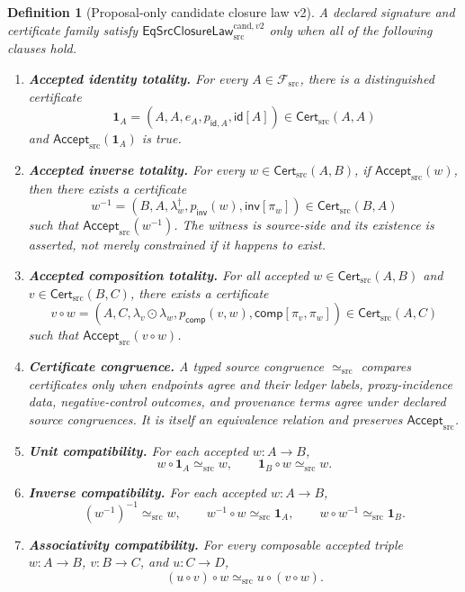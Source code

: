 \documentclass[11pt]{article}
\newtheorem{definition}{Definition}
\newcommand{\Cert}{\mathsf{Cert}_{\mathrm{src}}}
\newcommand{\Accept}{\mathsf{Accept}_{\mathrm{src}}}
\newcommand{\Law}{\mathsf{EqSrcClosureLaw}^{\mathrm{cand},v2}_{\mathrm{src}}}
\begin{document}
\begin{definition}[Proposal-only candidate closure law v2]
A declared signature and certificate family satisfy \(\Law\) only when all of
the following clauses hold.

\begin{enumerate}[leftmargin=*]
  \item \textbf{Accepted identity totality.}
  For every \(A\in\mathcal F_{\mathrm{src}}\), there is a distinguished
  certificate
  \[
    \mathbf 1_A
    =(A,A,e_A,p_{\mathsf{id},A},\mathsf{id}[A])
    \in\Cert(A,A)
  \]
  and \(\Accept(\mathbf 1_A)\) is true.

  \item \textbf{Accepted inverse totality.}
  For every \(w\in\Cert(A,B)\), if \(\Accept(w)\), then there exists a
  certificate
  \[
    w^{-1}
    =(B,A,\lambda_w^\dagger,p_{\mathsf{inv}}(w),
      \mathsf{inv}[\pi_w])
    \in\Cert(B,A)
  \]
  such that \(\Accept(w^{-1})\). The witness is source-side and its existence
  is asserted, not merely constrained if it happens to exist.

  \item \textbf{Accepted composition totality.}
  For all accepted \(w\in\Cert(A,B)\) and
  \(v\in\Cert(B,C)\), there exists a certificate
  \[
    v\circ w
    =(A,C,\lambda_v\odot\lambda_w,
      p_{\mathsf{comp}}(v,w),
      \mathsf{comp}[\pi_v,\pi_w])
    \in\Cert(A,C)
  \]
  such that \(\Accept(v\circ w)\).

  \item \textbf{Certificate congruence.}
  A typed source congruence \(\simeq_{\mathrm{src}}\) compares certificates
  only when endpoints agree and their ledger labels, proxy-incidence data,
  negative-control outcomes, and provenance terms agree under declared
  source congruences. It is itself an equivalence relation and preserves
  \(\Accept\).

  \item \textbf{Unit compatibility.}
  For each accepted \(w:A\to B\),
  \[
    w\circ\mathbf 1_A\simeq_{\mathrm{src}}w,
    \qquad
    \mathbf 1_B\circ w\simeq_{\mathrm{src}}w.
  \]

  \item \textbf{Inverse compatibility.}
  For each accepted \(w:A\to B\),
  \[
    (w^{-1})^{-1}\simeq_{\mathrm{src}}w,\qquad
    w^{-1}\circ w\simeq_{\mathrm{src}}\mathbf 1_A,\qquad
    w\circ w^{-1}\simeq_{\mathrm{src}}\mathbf 1_B.
  \]

  \item \textbf{Associativity compatibility.}
  For every composable accepted triple
  \(w:A\to B\), \(v:B\to C\), and \(u:C\to D\),
  \[
    (u\circ v)\circ w
    \simeq_{\mathrm{src}}
    u\circ(v\circ w).
  \]


\end{enumerate}
\end{definition}
\end{document}
